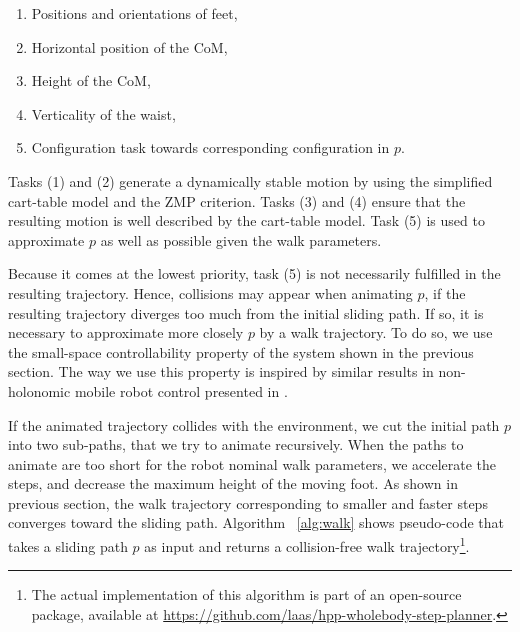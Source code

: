 \documentclass{article}
\begin{document}
\begin{enumerate}

\item Positions and orientations of  feet,

\item Horizontal position of the CoM,

\item Height of the CoM,

\item Verticality of the waist,

\item Configuration task towards corresponding
  configuration  in $p$.

\end{enumerate}

Tasks (1)  and (2) generate a  dynamically stable motion  by using the
simplified cart-table model  and the ZMP criterion. Tasks  (3) and (4)
ensure that the  resulting motion is well described  by the cart-table
model. Task (5)  is used to approximate $p$ as  well as possible given
the walk parameters.

Because it comes at the  lowest priority, task (5) is not necessarily
fulfilled in  the resulting trajectory. Hence,  collisions may appear
when animating $p$, if the resulting trajectory diverges too much from
the initial sliding  path. If so, it is  necessary to approximate more
closely $p$  by a walk  trajectory.  To do  so, we use  the small-space
controllability  property   of  the  system  shown   in  the  previous
section. The way  we use this property is  inspired by similar results
in non-holonomic mobile robot control presented in \cite{taix-94}.

If the animated  trajectory collides with the environment,  we cut the
initial  path   $p$  into  two   sub-paths,  that  we  try   to  animate
recursively. When the  paths to animate are too  short for the robot
nominal  walk parameters, we  accelerate the  steps, and  decrease the
maximum height of  the moving foot. As shown  in previous section, the
walk trajectory  corresponding to  smaller and faster  steps converges
toward the  sliding path.  Algorithm ~\ref{alg:walk} shows pseudo-code
that takes  a sliding path $p$  as input and  returns a collision-free
walk trajectory\footnote{The actual implementation of this algorithm is
part of an open-source package, available at
\url{https://github.com/laas/hpp-wholebody-step-planner}.}.
\end{document}
